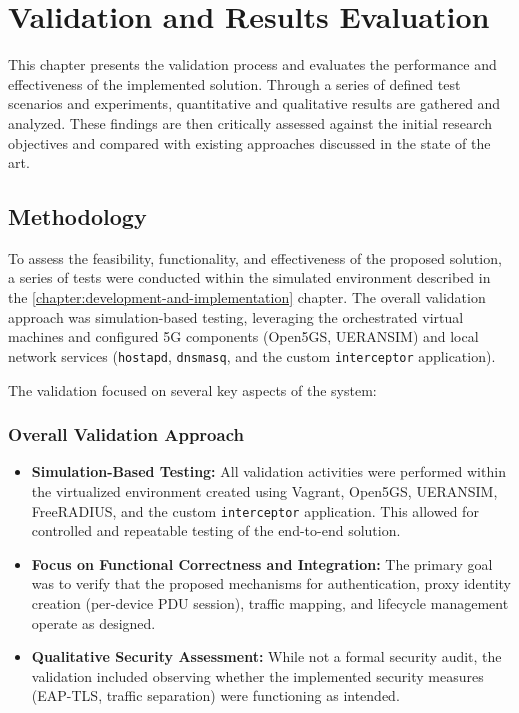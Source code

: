 \chapter{Validation and Results Evaluation}%
\label{chapter:validation-and-results-evaluation}

\begin{introduction}
This chapter presents the validation process and evaluates the performance and effectiveness of the implemented solution. Through a series of defined test scenarios and experiments, quantitative and qualitative results are gathered and analyzed. These findings are then critically assessed against the initial research objectives and compared with existing approaches discussed in the state of the art.
\end{introduction}

\section{Methodology}

To assess the feasibility, functionality, and effectiveness of the proposed solution, a series of tests were conducted within the simulated environment described in the \ref{chapter:development-and-implementation} chapter. The overall validation approach was simulation-based testing, leveraging the orchestrated virtual machines and configured \ac{5G} components (Open5GS, UERANSIM) and local network services (\texttt{hostapd}, \texttt{dnsmasq}, and the custom \texttt{interceptor} application).

The validation focused on several key aspects of the system:

\subsection{Overall Validation Approach}

\begin{itemize}
    \item \textbf{Simulation-Based Testing:} All validation activities were performed within the virtualized environment created using Vagrant, Open5GS, UERANSIM, FreeRADIUS, and the custom \texttt{interceptor} application. This allowed for controlled and repeatable testing of the end-to-end solution.

    \item \textbf{Focus on Functional Correctness and Integration:} The primary goal was to verify that the proposed mechanisms for authentication, proxy identity creation (per-device \ac{PDU} session), traffic mapping, and lifecycle management operate as designed.

    \item \textbf{Qualitative Security Assessment:} While not a formal security audit, the validation included observing whether the implemented security measures (\ac{EAP-TLS}, traffic separation) were functioning as intended.
\end{itemize}

